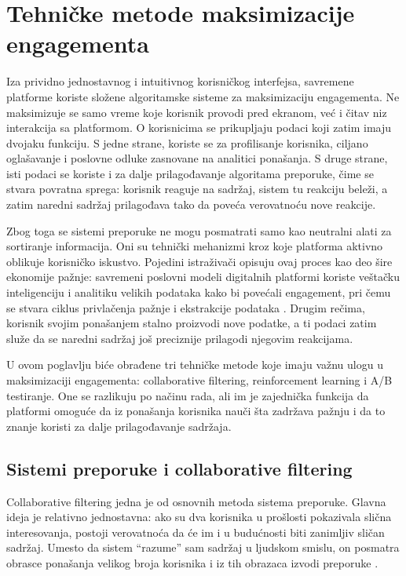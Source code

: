 \section{Tehničke metode maksimizacije engagementa}

Iza prividno jednostavnog i intuitivnog korisničkog interfejsa, savremene platforme koriste složene algoritamske sisteme za maksimizaciju engagementa. Ne maksimizuje se samo vreme koje korisnik provodi pred ekranom, već i čitav niz interakcija sa platformom. O korisnicima se prikupljaju podaci koji zatim imaju dvojaku funkciju. S jedne strane, koriste se za profilisanje korisnika, ciljano oglašavanje i poslovne odluke zasnovane na analitici ponašanja. S druge strane, isti podaci se koriste i za dalje prilagođavanje algoritama preporuke, čime se stvara povratna sprega: korisnik reaguje na sadržaj, sistem tu reakciju beleži, a zatim naredni sadržaj prilagođava tako da poveća verovatnoću nove reakcije.

Zbog toga se sistemi preporuke ne mogu posmatrati samo kao neutralni alati za sortiranje informacija. Oni su tehnički mehanizmi kroz koje platforma aktivno oblikuje korisničko iskustvo. Pojedini istraživači opisuju ovaj proces kao deo šire ekonomije pažnje: savremeni poslovni modeli digitalnih platformi koriste veštačku inteligenciju i analitiku velikih podataka kako bi povećali engagement, pri čemu se stvara ciklus privlačenja pažnje i ekstrakcije podataka \cite{gonzalez2024attention}. Drugim rečima, korisnik svojim ponašanjem stalno proizvodi nove podatke, a ti podaci zatim služe da se naredni sadržaj još preciznije prilagodi njegovim reakcijama.

U ovom poglavlju biće obrađene tri tehničke metode koje imaju važnu ulogu u maksimizaciji engagementa: collaborative filtering, reinforcement learning i A/B testiranje. One se razlikuju po načinu rada, ali im je zajednička funkcija da platformi omoguće da iz ponašanja korisnika nauči šta zadržava pažnju i da to znanje koristi za dalje prilagođavanje sadržaja.

\subsection{Sistemi preporuke i collaborative filtering}

Collaborative filtering jedna je od osnovnih metoda sistema preporuke. Glavna ideja je relativno jednostavna: ako su dva korisnika u prošlosti pokazivala slična interesovanja, postoji verovatnoća da će im i u budućnosti biti zanimljiv sličan sadržaj. Umesto da sistem “razume” sam sadržaj u ljudskom smislu, on posmatra obrasce ponašanja velikog broja korisnika i iz tih obrazaca izvodi preporuke \cite{wen2008collaborative}.

